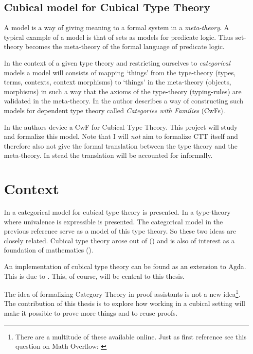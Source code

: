 \documentclass{article}
\newcommand{\sectiondescription}[1]{\iffalse #1\fi}
\begin{document}
\subsection{Cubical model for Cubical Type Theory}
%
A model is a way of giving meaning to a formal system in a \emph{meta-theory}. A
typical example of a model is that of sets as models for predicate logic. Thus
set-theory becomes the meta-theory of the formal language of predicate logic.

In the context of a given type theory and restricting ourselves to
\emph{categorical} models a model will consists of mapping `things' from the
type-theory (types, terms, contexts, context morphisms) to `things' in the
meta-theory (objects, morphisms) in such a way that the axioms of the
type-theory (typing-rules) are validated in the meta-theory. In
\cite{dybjer-1995} the author describes a way of constructing such models for
dependent type theory called \emph{Categories with Families} (CwFs).

In \cite{bezem-2014} the authors device a CwF for Cubical Type Theory. This
project will study and formalize this model. Note that I will \emph{not} aim to
formalize CTT itself and therefore also not give the formal translation between
the type theory and the meta-theory. In stead the translation will be accounted
for informally.
%
\section{Context}
%
\sectiondescription{%
Use one or two relevant and high quality references for providing evidence from
the literature that the proposed study indeed includes scientific and
engineering challenges, or is related to existing ones. Convince the reader that
the problem addressed in this thesis has not been solved prior to this project.
}
%
In \cite{bezem-2014} a categorical model for cubical type theory is presented.
In \cite{cohen-2016} a type-theory where univalence is expressible is presented.
The categorical model in the previous reference serve as a model of this type
theory. So these two ideas are closely related. Cubical type theory arose out of
 (\cite{hott-2013}) and is also of interest as a
foundation of mathematics (\cite{voevodsky-2011}).

An implementation of cubical type theory can be found as an extension to Agda.
This is due to \citeauthor{cubical-agda}. This, of course, will be central to
this thesis.

The idea of formalizing Category Theory in proof assistants is not a new
idea\footnote{There are a multitude of these available online. Just as first
reference see this question on Math Overflow: \cite{so-formalizations}}. The
contribution of this thesis is to explore how working in a cubical setting will
make it possible to prove more things and to reuse proofs.
\end{document}
